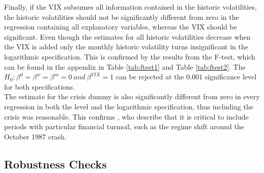 Finally, if the VIX subsumes all information contained in the historic volatilities, the historic volatilities should not be significantly different from zero in the regression containing all explanatory variables, whereas the VIX should be significant. Even though the estimates for all historic volatilities decrease when the VIX is added only the monthly historic volatility turns insignificant in the logarithmic specification. This is confirmed by the results from the F-test, which can be found in the appendix in Table \ref{tab:ftest1} and Table \ref{tab:ftest2}. The $H_{0}: \beta^{d} = \beta^{w} = \beta^{m} = 0 \ and \ \beta^{VIX} = 1$ can be rejected at the $0.001$ significance level for both specifications.\\
The estimate for the crisis dummy is also significantly different from zero in every regression in both the level and the logarithmic specification, thus including the crisis was reasonable. This confirms \textcite{jiang2003}, who describe that it is critical to include periods with particular financial turmoil, such as the regime shift  around the October 1987 crash.

%


\subsection{Robustness Checks}\label{sec51Robustness}

